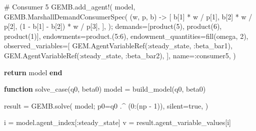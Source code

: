 \documentclass[
  letterpaper,
  DIV=11,
  numbers=noendperiod]{scrreprt}
\newenvironment{Shaded}{\begin{snugshade}}{\end{snugshade}}
\newcommand{\CommentTok}[1]{\textcolor[rgb]{0.37,0.37,0.37}{#1}}
\newcommand{\ConstantTok}[1]{\textcolor[rgb]{0.56,0.35,0.01}{#1}}
\newcommand{\ControlFlowTok}[1]{\textcolor[rgb]{0.00,0.23,0.31}{\textbf{#1}}}
\newcommand{\FloatTok}[1]{\textcolor[rgb]{0.68,0.00,0.00}{#1}}
\newcommand{\FunctionTok}[1]{\textcolor[rgb]{0.28,0.35,0.67}{#1}}
\newcommand{\KeywordTok}[1]{\textcolor[rgb]{0.00,0.23,0.31}{\textbf{#1}}}
\newcommand{\NormalTok}[1]{\textcolor[rgb]{0.00,0.23,0.31}{#1}}
\newcommand{\OperatorTok}[1]{\textcolor[rgb]{0.37,0.37,0.37}{#1}}
\begin{document}
\begin{codelisting}
{\begin{Shaded}
\begin{Highlighting}[]
    \CommentTok{\# Consumer 5}
\NormalTok{    GEMB.}\FunctionTok{add\_agent!}\NormalTok{(}
\NormalTok{        model,}
\NormalTok{        GEMB.}\FunctionTok{MarshallDemandConsumerSpec}\NormalTok{(}
\NormalTok{            (w, p, b) }\OperatorTok{{-}\textgreater{}}\NormalTok{ [}
\NormalTok{                b[}\FloatTok{1}\NormalTok{] }\OperatorTok{*}\NormalTok{ w }\OperatorTok{/}\NormalTok{ p[}\FloatTok{1}\NormalTok{],}
\NormalTok{                b[}\FloatTok{2}\NormalTok{] }\OperatorTok{*}\NormalTok{ w }\OperatorTok{/}\NormalTok{ p[}\FloatTok{2}\NormalTok{],}
\NormalTok{                (}\FloatTok{1} \OperatorTok{{-}}\NormalTok{ b[}\FloatTok{1}\NormalTok{] }\OperatorTok{{-}}\NormalTok{ b[}\FloatTok{2}\NormalTok{]) }\OperatorTok{*}\NormalTok{ w }\OperatorTok{/}\NormalTok{ p[}\FloatTok{3}\NormalTok{],}
\NormalTok{            ],}
\NormalTok{        );}
\NormalTok{        demands}\OperatorTok{=}\NormalTok{[}\FunctionTok{product}\NormalTok{(}\FloatTok{5}\NormalTok{), }\FunctionTok{product}\NormalTok{(}\FloatTok{6}\NormalTok{), }\FunctionTok{product}\NormalTok{(}\FloatTok{1}\NormalTok{)],}
\NormalTok{        endowments}\OperatorTok{=}\FunctionTok{product}\NormalTok{.(}\FloatTok{5}\OperatorTok{:}\FloatTok{6}\NormalTok{),}
\NormalTok{        endowment\_quantities}\OperatorTok{=}\FunctionTok{fill}\NormalTok{(omega, }\FloatTok{2}\NormalTok{),}
\NormalTok{        observed\_variables}\OperatorTok{=}\NormalTok{[}
\NormalTok{            GEM.}\FunctionTok{AgentVariableRef}\NormalTok{(}\OperatorTok{:}\NormalTok{steady\_state, }\OperatorTok{:}\NormalTok{beta\_bar1),}
\NormalTok{            GEM.}\FunctionTok{AgentVariableRef}\NormalTok{(}\OperatorTok{:}\NormalTok{steady\_state, }\OperatorTok{:}\NormalTok{beta\_bar2),}
\NormalTok{        ],}
\NormalTok{        name}\OperatorTok{=:}\NormalTok{consumer5,}
\NormalTok{    )}

    \ControlFlowTok{return}\NormalTok{ model}
\KeywordTok{end}

\KeywordTok{function} \FunctionTok{solve\_case}\NormalTok{(q0, beta0)}
\NormalTok{    model }\OperatorTok{=} \FunctionTok{build\_model}\NormalTok{(q0, beta0)}

\NormalTok{    result }\OperatorTok{=}\NormalTok{ GEMB.}\FunctionTok{solve}\NormalTok{(}
\NormalTok{        model;}
\NormalTok{        p0}\OperatorTok{=}\NormalTok{q0 }\OperatorTok{.\^{}}\NormalTok{ (}\FloatTok{0}\OperatorTok{:}\NormalTok{(np }\OperatorTok{{-}} \FloatTok{1}\NormalTok{)),}
\NormalTok{        silent}\OperatorTok{=}\ConstantTok{true}\NormalTok{,}
\NormalTok{    )}

\NormalTok{    i }\OperatorTok{=}\NormalTok{ model.agent\_index[}\OperatorTok{:}\NormalTok{steady\_state]}
\NormalTok{    v }\OperatorTok{=}\NormalTok{ result.agent\_variable\_values[i]}


\end{Highlighting}
\end{Shaded}}
\end{codelisting}
\end{document}
